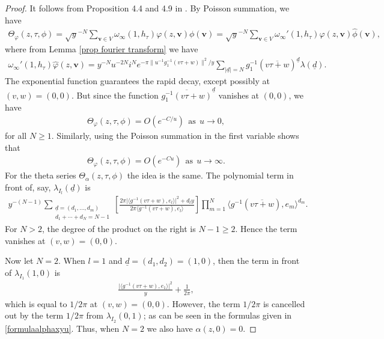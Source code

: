 \documentclass[twoside,a4paper,10pt]{article} %
\newcommand{\uud}{\underline{d}}
\newcommand{\alphahat}{\widehat{\alpha}}
\newcommand{\8}{\infty}
\newcommand{\vbf}{\mathbf{v}}
\newcommand{\vphat}{\widehat{\phi}}
\theoremstyle{mytheoremstyle}
\theoremstyle{remark}
\numberwithin{equation}{section}
\begin{document}
\begin{proof} It follows from Proposition 4.4 and 4.9 in \cite{rbrsln}. 
By Poisson summation, we have
\begin{align}
\Theta_{\varphi}(z,\tau,\phi) =\sqrt{y}^{-N} \sum_{\vbf \in V} \omega_\8(1,h_\tau)\varphi(z,\vbf) \phi(\vbf) =\sqrt{y}^{-N} \sum_{\vbf \in V} \omega_\8'(1,h_\tau)\widehat{\varphi}(z,\vbf) \vphat(\vbf),
\end{align}
where from Lemma \ref{prop fourier transform} we have
 \begin{align}
\omega_\8'(1,h_\tau)\widehat{\varphi}(z,\vbf)=y^{-N}u^{-2N}i^N e^{-\pi  \lVert u^{-1}g_1^{-1}(v\tau+w) \rVert^2/y} \sum_{\vert \uud \vert=N}  g_1^{-1}(\overline{v\tau+w})^{\uud}  \lambda(\uud).
\end{align}
The exponential function guarantees the rapid decay, except possibly at $(v,w)=(0,0)$. But since the function $\overline{g_1^{-1}(v\tau+w)}^{\uud}$ vanishes at $(0,0)$, we have
\begin{align}
\Theta_{\varphi}(z,\tau,\phi)=O(e^{-C/u}) \ \ \textrm{as} \ \ u \rightarrow 0,
\end{align}
for all $N \geq 1$. Similarly, using the Poisson summation in the first variable shows that
\begin{align}
\Theta_{\varphi}(z,\tau,\phi)=O(e^{-Cu}) \ \ \textrm{as} \ \ u \rightarrow \8.
\end{align}
For the theta series $\Theta_{\alpha}(z,\tau,\phi)$ the idea is the same. The polynomial term in front of, say, $\lambda_{I_l}(\uud)$ is
\begin{align} \label{expression fourier}
y^{-(N-1)}\sum_{\substack{\uud=(d_1, \dots,d_m) \\ d_1+\cdots +d_N=N-1}}\left [ \frac{2\pi \vert \langle g^{-1}(v\tau+w),e_l\rangle \vert ^2+d_ly}{2\pi\langle g^{-1}(\overline{v\tau+w}),e_l\rangle}\right ] \prod_{m=1}^N\langle g^{-1}(\overline{v\tau+w}),e_m\rangle^{d_m}.
\end{align}
For $N>2$, the degree of the product on the right is $N-1\geq 2$. Hence the term vanishes at $(v,w)=(0,0)$.


Now let $N=2$. When $l=1$ and $\uud=(d_1,d_2)=(1,0)$, then the term in front of $\lambda_{I_1}(1,0)$ is
\begin{align}
\frac{\vert \langle g^{-1}(v\tau+w),e_1\rangle \vert ^2}{y}+\frac{1}{2\pi},
\end{align}
which is equal to $1/2\pi$ at $(v,w)=(0,0)$. However, the term $1/2\pi$ is cancelled out by the term $1/2\pi$ from $\lambda_{I_2}(0,1)$; as can be seen in the formulas given in \eqref{formulaalphaxyu}. Thus, when $N=2$ we also have $\alphahat(z,0)=0$.
\end{proof}
\end{document}
